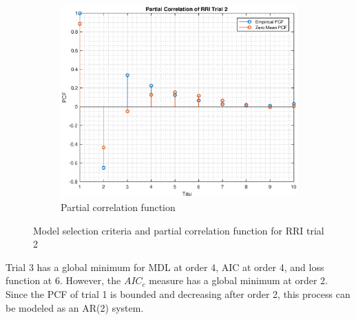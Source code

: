 \begin{figure}[h!]
\begin{subfigure}{0.32\textwidth}
\centering
\includegraphics[width = \textwidth]{heart_pcf_t2}
\caption{Partial correlation function}
\label{fig:heart_pcf_t1}
\end{subfigure}
\caption{Model selection criteria and partial correlation function for RRI trial 2}
\label{heart_t2}
\end{figure}

Trial 3 has a global minimum for MDL at order 4, AIC at order 4, and loss function at 6. However, the $AIC_c$ measure has a global minimum at order 2. Since the PCF of trial 1 is bounded and decreasing after order 2, this process can be modeled as an AR(2) system.\\

